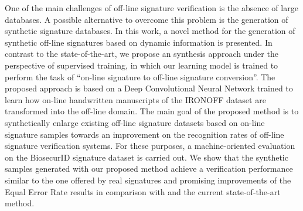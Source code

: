 \setlength{\absparsep}{18pt} %
\begin{resumo}

One of the main challenges of off-line signature
verification is the absence of large databases. A possible
alternative to overcome this problem is the generation of synthetic signature databases. In this work, a novel method for the generation of synthetic off-line signatures based on dynamic
information is presented. In contrast to the state-of-the-art, we propose an synthesis approach under the perspective of supervised training, in which our learning model is trained to perform the task of ``on-line signature to off-line signature conversion''. The proposed approach is based on a Deep Convolutional Neural Network trained to learn how on-line handwritten manuscripts of the IRONOFF dataset are transformed into the off-line domain. The main goal of the proposed method is to synthetically enlarge existing off-line signature datasets based on on-line signature samples towards an improvement on the recognition rates of off-line signature verification systems. For these purposes, a machine-oriented evaluation on the BiosecurID signature dataset is carried out. We show that the synthetic samples generated with our proposed method achieve a verification performance similar to the one offered by real signatures and promising improvements of the Equal Error Rate results in comparison with and the current state-of-the-art method.


\end{resumo}


